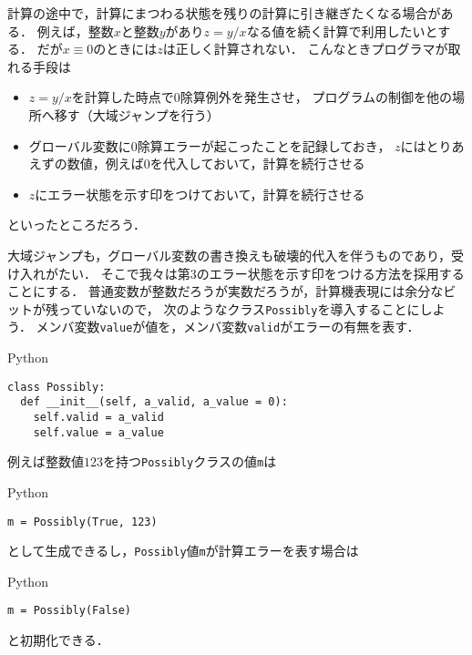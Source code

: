 \documentclass[a5paper,draft]{jsbook}
\newcommand{\programminglanguage}[1]{\textsf{#1}}
\newcommand{\python}{\programminglanguage{Python}}
\newcommand{\code}[1]{\texttt{#1}}
\newenvironment{pythoncode}{\begin{itembox}[r]{\python}}{\end{itembox}}
\begin{document}
計算の途中で，計算にまつわる状態を残りの計算に引き継ぎたくなる場合がある．
例えば，整数$x$と整数$y$があり$z=y/x$なる値を続く計算で利用したいとする．
だが$x\equiv0$のときには$z$は正しく計算されない．
こんなときプログラマが取れる手段は
\begin{itemize}
\item $z=y/x$を計算した時点で$0$除算例外を発生させ，
プログラムの制御を他の場所へ移す（大域ジャンプを行う）
\item グローバル変数に$0$除算エラーが起こったことを記録しておき，
$z$にはとりあえずの数値，例えば$0$を代入しておいて，計算を続行させる
\item $z$にエラー状態を示す印をつけておいて，計算を続行させる
\end{itemize}
といったところだろう．

大域ジャンプも，グローバル変数の書き換えも破壊的代入を伴うものであり，受け入れがたい．
そこで我々は第3のエラー状態を示す印をつける方法を採用することにする．
普通変数が整数だろうが実数だろうが，計算機表現には余分なビットが残っていないので，
次のようなクラス\code{Possibly}を導入することにしよう．
メンバ変数\code{value}が値を，メンバ変数\code{valid}がエラーの有無を表す．
\begin{pythoncode}
\begin{verbatim}
class Possibly:
  def __init__(self, a_valid, a_value = 0):
    self.valid = a_valid
    self.value = a_value
\end{verbatim}
\end{pythoncode}

例えば整数値$123$を持つ\code{Possibly}クラスの値\code{m}は
\begin{pythoncode}
\begin{verbatim}
m = Possibly(True, 123)
\end{verbatim}
\end{pythoncode}
として生成できるし，\code{Possibly}値\code{m}が計算エラーを表す場合は
\begin{pythoncode}
\begin{verbatim}
m = Possibly(False)
\end{verbatim}
\end{pythoncode}
と初期化できる．
\end{document}
